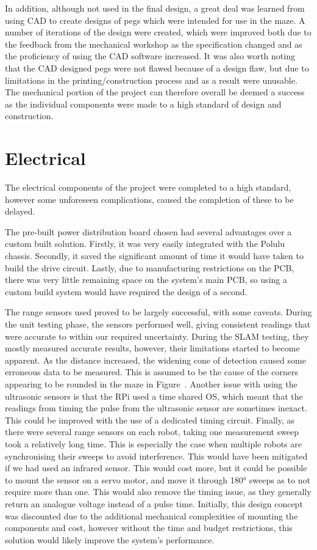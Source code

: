 In addition, although not used in the final design, a great deal was learned from 
using CAD to create designs of pegs which were intended for use in the maze. A number 
of iterations of the design were created, which were  improved  both due to the feedback from the mechanical workshop as the specification changed and as the proficiency of using the CAD software increased. It was also worth noting that the CAD designed pegs were not flawed
because of a design flaw, but due to limitations in the printing/construction process and as a result were unusable. 
The mechanical portion of the project can therefore overall be deemed a success as 
the individual components were made to a high standard of design and construction. 

\section{Electrical}\label{eval/elec}
The electrical components of the project were completed to a high standard, 
however some unforeseen complications, caused the completion of these to be delayed.

The pre-built power distribution board chosen had several advantages over a 
custom built solution. Firstly, it was very easily integrated with the Polulu 
chassis. Secondly, it saved the significant amount of time it would have taken 
to build the drive circuit. Lastly, due to manufacturing restrictions on the PCB, 
there was very little remaining space on the system's main PCB, so using a custom 
build system would have required the design of a second. 

The range sensors used proved to be largely successful, with some caveats. 
During the unit testing phase, the sensors performed well, giving consistent 
readings that were accurate to within our required uncertainty. During the SLAM testing, 
they mostly measured accurate results, however, their limitations started to 
become apparent. As the distance increased, the widening cone of detection caused some 
erroneous data to be measured. This is assumed to be the cause of the corners 
appearing to be rounded in the maze in Figure~. 
Another issue with using the ultrasonic sensors is that the RPi used a time 
shared OS, which meant that the readings from timing the pulse from the 
ultrasonic sensor are sometimes inexact. This could be improved with the use of 
a dedicated timing circuit. Finally, as there were several range sensors on each 
robot, taking one measurement sweep took a relatively long time. This is 
especially the case when multiple robots are synchronising their sweeps to avoid 
interference. This would have been mitigated if we had used an infrared sensor. 
This would cost more, but it could be possible to mount the sensor on a servo 
motor, and move it through \ang{180} sweeps as to not require more than one. 
This would also remove the timing issue, as they generally return an analogue 
voltage instead of a pulse time. Initially, this design concept was discounted  due to the additional mechanical complexities of mounting the components and 
cost, however without the time and budget restrictions, this solution would 
likely improve the system's performance. 

